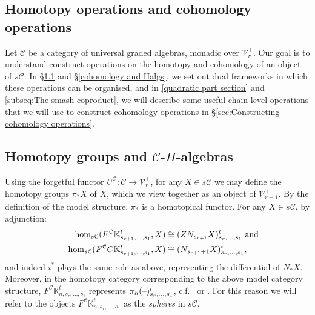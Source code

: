 \documentclass[11pt]{amsart}
\theoremstyle{plain}
\theoremstyle{definition}
\newcommand{\DASH}{\textup{--}}
\renewcommand{\to}{\longrightarrow}
\newcommand{\calV}{\mathcal{V}}
\newcommand{\calc}{\mathcal{C}}
\theoremstyle{plain}
\newcommand{\vect}[2]{\calV^{#1}_{#2}}
\begin{document}
\begin{CPiAlgs and CHalgs}

\section{\textbf{Homotopy operations and cohomology operations}}
Let $\calc$ be a category of universal graded algebras, monadic over $\vect{+}{r}$. Our goal is to understand construct operations on the homotopy and cohomology of an object of $s\calc$. In \S\ref{homotopy and pialgs} and \S\ref{cohomology and Halgs}, we set out dual frameworks in which these operations can be organised, and in \ref{quadratic part section} and \ref{subseq:The smash coproduct}, we will describe some useful chain level operations that we will use to construct cohomology operations in \S\ref{sec:Constructing cohomology operations}.


\subsection{Homotopy groups and $\calc$-$\Pi$-algebras}\label{homotopy and pialgs}
Using the forgetful functor $U^\calc:\calc\to \vect{+}{r}$, for any $X\in s\calc$ we may define the homotopy groups $\pi_*X$ of $X$,
which we view together as an object  of $\vect{+}{r+1}$. By the definition of the model structure, $\pi_*$ is a homotopical functor.
For any $X\in s\calc$, by adjunction:
\begin{alignat*}{2}
\hom_{s\calc}(F^\calc\mathbb{K}^t_{s_{r+1},\ldots,s_1},X)&\cong (ZN_{s_{r+1}}X)_{s_r,\ldots,s_1}^t\makebox[0cm][l]{ and}\\
\hom_{s\calc}(F^\calc C\mathbb{K}^t_{s_{r+1},\ldots,s_1},X)&\cong (N_{s_{r+1}+1}X)_{s_r,\ldots,s_1}^t,
\end{alignat*}
and indeed $i^*$ plays the same role as above, representing the differential of $N_*X$. Moreover, in the homotopy category corresponding to the above model category structure, $F^\calc\mathbb{K}^t_{n,s_r,\ldots,s_1}$ represents $\pi_n(\DASH)^t_{s_r,\ldots,s_1}$, c.f.\ \cite[\S1]{MR1089001} or \cite[\S3.1.1]{Blanc_Stover-Groth_SS.pdf}. For this reason we will refer to the objects $F^\calc\mathbb{K}^t_{n,s_r,\ldots,s_1}$ as the \emph{spheres} in $s\calc$.


\end{CPiAlgs and CHalgs}
\end{document}

